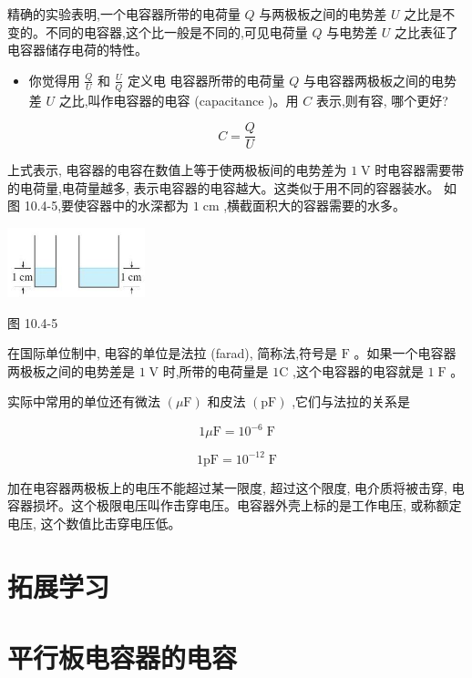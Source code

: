 \documentclass[10pt]{article}
\begin{document}
精确的实验表明,一个电容器所带的电荷量 \(Q\) 与两极板之间的电势差 \(U\) 之比是不变的。不同的电容器,这个比一般是不同的,可见电荷量 \(Q\) 与电势差 \(U\) 之比表征了电容器储存电荷的特性。

\begin{itemize}
\item 你觉得用 \(\frac{Q}{U}\) 和 \(\frac{U}{Q}\) 定义电 电容器所带的电荷量 \(Q\) 与电容器两极板之间的电势差 \(U\) 之比,叫作电容器的电容 (capacitance )。用 \(C\) 表示,则有容, 哪个更好?
\end{itemize}

\[
C = \frac{Q}{U}
\]

上式表示, 电容器的电容在数值上等于使两极板间的电势差为 \(1\mathrm{\;V}\) 时电容器需要带的电荷量,电荷量越多, 表示电容器的电容越大。这类似于用不同的容器装水。 如图 10.4-5,要使容器中的水深都为 \(1\mathrm{\;{cm}}\) ,横截面积大的容器需要的水多。

\begin{center}
\includegraphics[max width=0.3\textwidth]{images/01911d5f-8e38-70c0-b5b8-2b399bd115b6_45_423738.jpg}
\end{center}

图 10.4-5

在国际单位制中, 电容的单位是法拉 (farad), 简称法,符号是 \(\mathrm{F}\) 。如果一个电容器两极板之间的电势差是 \(1\mathrm{\;V}\) 时,所带的电荷量是 \(1\mathrm{C}\) ,这个电容器的电容就是 \(1\mathrm{\;F}\) 。

实际中常用的单位还有微法 \(\left( {\mu \mathrm{F}}\right)\) 和皮法 \(\left( \mathrm{{pF}}\right)\) ,它们与法拉的关系是

\[
{1\mu }\mathrm{F} = {10}^{-6}\mathrm{\;F}
\]

\[
1\mathrm{{pF}} = {10}^{-{12}}\mathrm{\;F}
\]

加在电容器两极板上的电压不能超过某一限度, 超过这个限度, 电介质将被击穿, 电容器损坏。这个极限电压叫作击穿电压。电容器外壳上标的是工作电压, 或称额定电压, 这个数值比击穿电压低。

\section*{拓展学习}

\section*{平行板电容器的电容}
\end{document}
